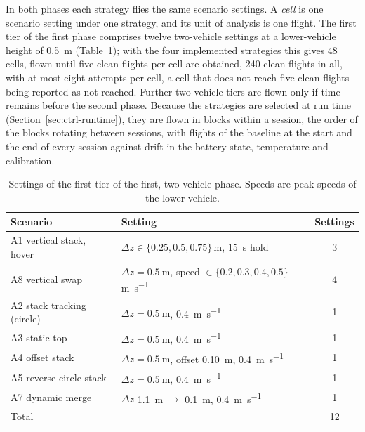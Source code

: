 In both phases each strategy flies the same scenario settings. A \emph{cell} is one scenario
setting under one strategy, and its unit of analysis is one flight. The first tier of the first
phase comprises twelve two-vehicle settings at a lower-vehicle height of \SI{0.5}{\metre} (Table~\ref{tab:setup-tier1}); with the four
implemented strategies this gives 48 cells, flown until five clean flights per cell are obtained,
240 clean flights in all, with at most eight attempts per cell, a cell that does not reach five
clean flights being reported as not reached. Further two-vehicle tiers are flown only if time
remains before the second phase.
Because the strategies are selected at run time (Section~\ref{sec:ctrl-runtime}), they are flown in
blocks within a session, the order of the blocks rotating between sessions, with flights of the
baseline at the start and the end of every session against drift in the battery state, temperature
and calibration.

\begin{table}[t]
  \centering
  \caption{Settings of the first tier of the first, two-vehicle phase. Speeds are peak speeds of the
    lower vehicle.}
  \label{tab:setup-tier1}
  \small
  \begin{tabular}{@{}llc@{}}
    \toprule
    Scenario & Setting & Settings \\
    \midrule
    A1 vertical stack, hover & $\Delta z \in \{0.25, 0.5, 0.75\}$\,\si{\metre}, \SI{15}{\second} hold & 3 \\
    A8 vertical swap & $\Delta z = \SI{0.5}{\metre}$, speed $\in \{0.2, 0.3, 0.4, 0.5\}$\,\si{\metre\per\second} & 4 \\
    A2 stack tracking (circle) & $\Delta z = \SI{0.5}{\metre}$, \SI{0.4}{\metre\per\second} & 1 \\
    A3 static top & $\Delta z = \SI{0.5}{\metre}$, \SI{0.4}{\metre\per\second} & 1 \\
    A4 offset stack & $\Delta z = \SI{0.5}{\metre}$, offset \SI{0.10}{\metre}, \SI{0.4}{\metre\per\second} & 1 \\
    A5 reverse-circle stack & $\Delta z = \SI{0.5}{\metre}$, \SI{0.4}{\metre\per\second} & 1 \\
    A7 dynamic merge & $\Delta z$ \SI{1.1}{\metre} $\to$ \SI{0.1}{\metre}, \SI{0.4}{\metre\per\second} & 1 \\
    \midrule
    Total & & 12 \\
    \bottomrule
  \end{tabular}
\end{table}

